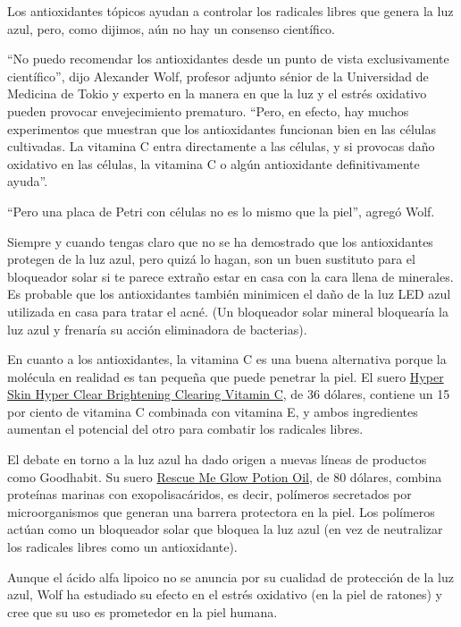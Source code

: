 Los antioxidantes tópicos ayudan a controlar los radicales libres que
genera la luz azul, pero, como dijimos, aún no hay un consenso
científico.

``No puedo recomendar los antioxidantes desde un punto de vista
exclusivamente científico'', dijo Alexander Wolf, profesor adjunto
sénior de la Universidad de Medicina de Tokio y experto en la manera en
que la luz y el estrés oxidativo pueden provocar envejecimiento
prematuro. ``Pero, en efecto, hay muchos experimentos que muestran que
los antioxidantes funcionan bien en las células cultivadas. La vitamina
C entra directamente a las células, y si provocas daño oxidativo en las
células, la vitamina C o algún antioxidante definitivamente ayuda''.

``Pero una placa de Petri con células no es lo mismo que la piel'',
agregó Wolf.

Siempre y cuando tengas claro que no se ha demostrado que los
antioxidantes protegen de la luz azul, pero quizá lo hagan, son un buen
sustituto para el bloqueador solar si te parece extraño estar en casa
con la cara llena de minerales. Es probable que los antioxidantes
también minimicen el daño de la luz LED azul utilizada en casa para
tratar el acné. (Un bloqueador solar mineral bloquearía la luz azul y
frenaría su acción eliminadora de bacterias).

En cuanto a los antioxidantes, la vitamina C es una buena alternativa
porque la molécula en realidad es tan pequeña que puede penetrar la
piel. El suero
\href{https://gethyperskin.com/products/hyper-clear}{Hyper Skin Hyper
Clear Brightening Clearing Vitamin C}, de 36 dólares, contiene un 15 por
ciento de vitamina C combinada con vitamina E, y ambos ingredientes
aumentan el potencial del otro para combatir los radicales libres.

El debate en torno a la luz azul ha dado origen a nuevas líneas de
productos como Goodhabit. Su suero
\href{https://goodhabitskin.com/products/glow-potion-oil-serum}{Rescue
Me Glow Potion Oil}, de 80 dólares, combina proteínas marinas con
exopolisacáridos, es decir, polímeros secretados por microorganismos que
generan una barrera protectora en la piel. Los polímeros actúan como un
bloqueador solar que bloquea la luz azul (en vez de neutralizar los
radicales libres como un antioxidante).

Aunque el ácido alfa lipoico no se anuncia por su cualidad de protección
de la luz azul, Wolf ha estudiado su efecto en el estrés oxidativo (en
la piel de ratones) y cree que su uso es prometedor en la piel humana.

